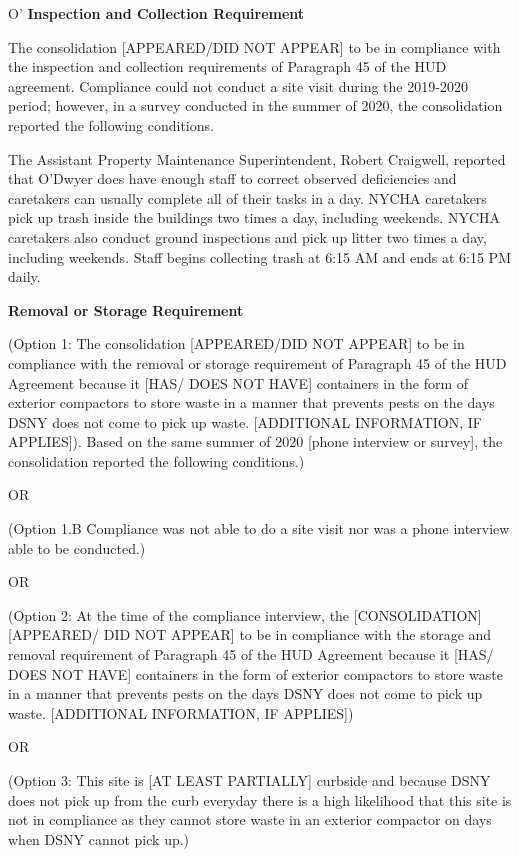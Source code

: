 O'
\textbf{Inspection and Collection Requirement}

The consolidation [APPEARED/DID NOT APPEAR] to be in compliance with the inspection and collection requirements of Paragraph 45 of the HUD agreement. Compliance could not conduct a site visit during the 2019-2020 period; however, in a survey conducted in the summer of 2020, the consolidation reported the following conditions.

The Assistant Property Maintenance Superintendent, Robert Craigwell, reported that O'Dwyer does have enough staff to correct observed deficiencies and caretakers can usually complete all of their tasks in a day. NYCHA caretakers pick up trash inside the buildings two times a day, including weekends. NYCHA caretakers also conduct ground inspections and pick up litter two times a day, including weekends. Staff begins collecting trash at 6:15 AM and ends at 6:15 PM daily. 

\textbf{Removal or Storage Requirement}

(Option 1: The consolidation [APPEARED/DID NOT APPEAR] to be in compliance with the  removal or storage requirement of Paragraph  45 of the HUD Agreement because it [HAS/ DOES NOT HAVE] containers in the form of exterior compactors to store waste in a manner that prevents pests on the days DSNY does not come to pick up waste. [ADDITIONAL INFORMATION, IF APPLIES]). Based on the same summer of  2020 [phone interview or survey], the consolidation reported the following conditions.)

OR 

(Option 1.B Compliance was not able to do a site visit nor was a phone interview able to be conducted.)

OR

(Option 2: At the time of the compliance interview, the [CONSOLIDATION] [APPEARED/ DID NOT APPEAR] to be in compliance with the storage and removal requirement of Paragraph 45 of the HUD Agreement because it [HAS/ DOES NOT HAVE] containers in the form of exterior compactors to store waste in a manner that prevents pests on the days DSNY does not come to pick up waste. [ADDITIONAL INFORMATION, IF APPLIES])

OR 

(Option 3: This site is [AT LEAST PARTIALLY] curbside and because DSNY does not pick up from the curb everyday there is a high likelihood that this site is not in compliance as they cannot store waste in an exterior compactor on days when DSNY cannot pick up.) 

